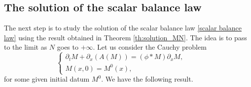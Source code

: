 \documentclass[11pt,a4paper,oneside]{amsart}
\begin{document}
\subsection{\color{black}The solution of the scalar balance law}
The next step is to study the solution of the scalar balance law \eqref{scalar balance law} using the result obtained 
in Theorem \ref{th:solution_MN}. %
The idea is to pass to the limit as $N$ goes to $+\infty$. %
Let us consider the %
Cauchy problem
\begin{equation}\label{def:Cauchy_problem}
\begin{cases}
    \partial_tM+\partial_x(A(M))=(\phi\ast M)\partial_x M,\qquad \\M(x,0)=M^0(x), 
    \end{cases}
\end{equation}
for some given initial datum $M^0$. We have the following result.
\end{document}
